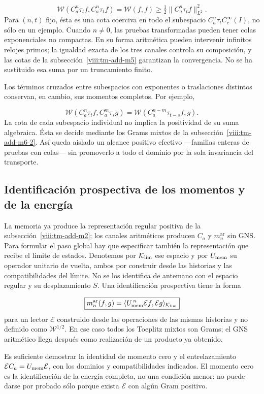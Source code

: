 \[
\boxed{\mathscr W(C_a^n\tau_t f,C_a^n\tau_t f)
=\mathscr W(f,f)
\geq\tfrac12\|C_a^n\tau_t f\|_{L^2}^2.}
\]
Para \((n,t)\) fijo, ésta es una cota coerciva en todo el subespacio \(C_a^n\tau_t C_c^\infty(I)\), no sólo en un ejemplo. Cuando \(n\ne0\), las pruebas transformadas pueden tener colas exponenciales no compactas. En su forma aritmética pueden intervenir infinitos relojes primos; la igualdad exacta de los tres canales controla su composición, y las cotas de la subsección~\ref{viii:tm-add-m5} garantizan la convergencia. No se ha sustituido esa suma por un truncamiento finito.

Los términos cruzados entre subespacios con exponentes o traslaciones distintos conservan, en cambio, sus momentos completos. Por ejemplo,

\[
\mathscr W(C_a^n\tau_t f,C_a^m\tau_s g)
=\mathscr W(C_a^{n-m}\tau_{t-s}f,g).
\]
La cota de cada subespacio individual no implica la positividad de su suma algebraica. Ésta se decide mediante los Grams mixtos de la subsección~\ref{viii:tm-add-m6-2}. Así queda aislado un alcance positivo efectivo —familias enteras de pruebas con colas— sin promoverlo a todo el dominio por la sola invariancia del transporte.


\subsection{Identificación prospectiva de los momentos y de la energía}
\label{viii:tm-add-m7}
La memoria ya produce la representación regular positiva de la
subsección~\ref{viii:tm-add-m2}; los canales aritméticos producen \(C_a\)
y \(m_n^{\mathrm{ar}}\) sin GNS. Para formular el paso global hay que
especificar también la representación que recibe el límite de estados.
Denotemos por \(\mathcal K_{\rm lim}\) ese espacio y por
\(U_{\rm mem}\) su operador unitario de vuelta, ambos por construir
desde las historias y las compatibilidades del límite. No se los
identifica de antemano con el espacio regular y su desplazamiento \(S\).
Una identificación prospectiva tiene la forma

\[
\boxed{m_n^{\mathrm{ar}}(f,g)
=\langle U_{\rm mem}^{\,n}\mathcal E f,\mathcal E g\rangle_{\mathcal K_{\rm lim}}}
\]
para un lector \(\mathcal E\) construido desde las operaciones de las mismas historias y no definido como \(\mathscr W^{1/2}\). En ese caso todos los Toeplitz mixtos son Grams; el GNS aritmético llega después como realización de un producto ya obtenido.

Es suficiente demostrar la identidad de momento cero y el entrelazamiento
\(\mathcal E C_a=U_{\rm mem}\mathcal E\), con los dominios y
compatibilidades indicados. El momento cero es la identificación de la
energía completa, no una condición menor: no puede darse por probado
sólo porque exista \(\mathcal E\) con algún Gram positivo.

